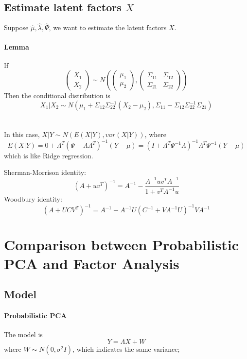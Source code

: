 \documentclass[12pt]{book}
\theoremstyle{definition}
\theoremstyle{remark}
\begin{document}
\subsection{Estimate latent factors $X$}
Suppose $\hat{\mu}, \hat{\lambda}, \hat{\Psi}$, we want to estimate the latent factors $X$.

\paragraph{Lemma} If 
\[\begin{pmatrix}
 X_1\\
X_2
\end{pmatrix}\sim N(\begin{pmatrix}
 \mu_1\\
\mu_2
\end{pmatrix}, \begin{pmatrix}
 \Sigma_{11} & \Sigma_{12}\\
 \Sigma_{21} & \Sigma_{22} \end{pmatrix})\]
 Then the conditional distribution is 
 \[X_1|X_2 \sim N(\mu_1+ \Sigma_{12}\Sigma_{22}^{-1}(X_2 - \mu_2), \Sigma_{11} - \Sigma_{12}\Sigma_{22}^{-1}\Sigma_{21})\]
\\
\\
 In this case, $X|Y \sim N(E(X|Y), var(X|Y))$, where 
 \[E(X|Y) = 0 + \Lambda^T(\Psi + \Lambda\Lambda^T)^{-1}(Y - \mu) = (I+\Lambda^T\Psi^{-1}\Lambda)^{-1}\Lambda^T\Psi^{-1}(Y-\mu)\]
 which is like Ridge regression.

\begin{notionbox}[Note]
    Sherman-Morrison identity: 
    \[(A+ uv^T)^{-1} = A^{-1} - \frac{A^{-1}uv^TA^{-1}}{1+v^TA^{-1}u}\]
    Woodbury identity: 
    \[(A+UCV^T)^{-1} = A^{-1} - A^{-1}U(C^{-1}+VA^{-1}U)^{-1}VA^{-1}\]
\end{notionbox}


\newpage
\section{Comparison between Probabilistic PCA and Factor Analysis}
\subsection{Model}

\paragraph{Probabilistic PCA}
The model is  \[Y = \Lambda X+W\]
where $W\sim N(0,\sigma^2 I)$, which indicates the same variance;
\end{document}
